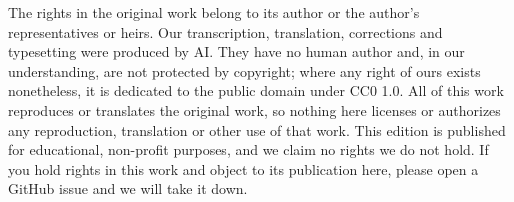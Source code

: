 \documentclass[11pt,a4paper,leqno]{article}
\begin{document}







\par\vspace{2\baselineskip}
\noindent\begin{minipage}{\linewidth}\small The rights in the original work belong to its author or the author's representatives or heirs. Our transcription, translation, corrections and typesetting were produced by AI. They have no human author and, in our understanding, are not protected by copyright; where any right of ours exists nonetheless, it is dedicated to the public domain under CC0 1.0. All of this work reproduces or translates the original work, so nothing here licenses or authorizes any reproduction, translation or other use of that work. This edition is published for educational, non-profit purposes, and we claim no rights we do not hold. If you hold rights in this work and object to its publication here, please open a GitHub issue and we will take it down.\end{minipage}\par
\end{document}
